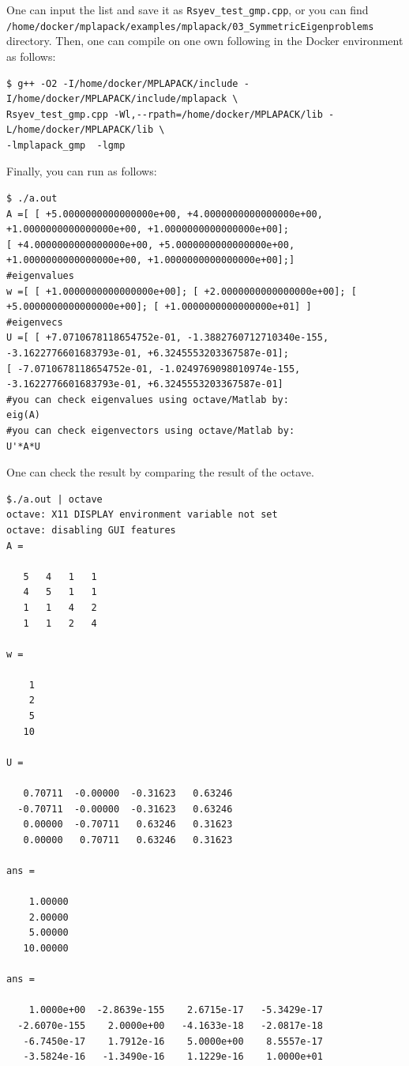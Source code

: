 \documentclass[12pt]{article}
\begin{document}
One can input the list and save it as {\tt Rsyev\_test\_gmp.cpp}, or you can find\\
{\tt /home/docker/mplapack/examples/mplapack/03\_SymmetricEigenproblems} directory. Then, one can compile on one own following in the Docker environment as follows:
\begin{verbatim}
$ g++ -O2 -I/home/docker/MPLAPACK/include -I/home/docker/MPLAPACK/include/mplapack \
Rsyev_test_gmp.cpp -Wl,--rpath=/home/docker/MPLAPACK/lib -L/home/docker/MPLAPACK/lib \
-lmplapack_gmp  -lgmp
\end{verbatim}
Finally, you can run as follows:
{\fontsize{9.5pt}{0.4cm}\selectfont
\begin{verbatim}
$ ./a.out
A =[ [ +5.0000000000000000e+00, +4.0000000000000000e+00, +1.0000000000000000e+00, +1.0000000000000000e+00];
[ +4.0000000000000000e+00, +5.0000000000000000e+00, +1.0000000000000000e+00, +1.0000000000000000e+00];]
#eigenvalues
w =[ [ +1.0000000000000000e+00]; [ +2.0000000000000000e+00]; [ +5.0000000000000000e+00]; [ +1.0000000000000000e+01] ]
#eigenvecs
U =[ [ +7.0710678118654752e-01, -1.3882760712710340e-155, -3.1622776601683793e-01, +6.3245553203367587e-01];
[ -7.0710678118654752e-01, -1.0249769098010974e-155, -3.1622776601683793e-01, +6.3245553203367587e-01]
#you can check eigenvalues using octave/Matlab by:
eig(A)
#you can check eigenvectors using octave/Matlab by:
U'*A*U
\end{verbatim}
}
One can check the result by comparing the result of the octave.
{\footnotesize
\begin{verbatim}
$./a.out | octave
octave: X11 DISPLAY environment variable not set
octave: disabling GUI features
A =

   5   4   1   1
   4   5   1   1
   1   1   4   2
   1   1   2   4

w =

    1
    2
    5
   10

U =

   0.70711  -0.00000  -0.31623   0.63246
  -0.70711  -0.00000  -0.31623   0.63246
   0.00000  -0.70711   0.63246   0.31623
   0.00000   0.70711   0.63246   0.31623

ans =

    1.00000
    2.00000
    5.00000
   10.00000

ans =

    1.0000e+00  -2.8639e-155    2.6715e-17   -5.3429e-17
  -2.6070e-155    2.0000e+00   -4.1633e-18   -2.0817e-18
   -6.7450e-17    1.7912e-16    5.0000e+00    8.5557e-17
   -3.5824e-16   -1.3490e-16    1.1229e-16    1.0000e+01

\end{verbatim}
}
\end{document}
